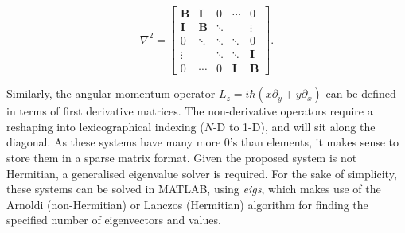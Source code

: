 \begin{equation}
    \nabla^2=
    \begin{bmatrix}
        \mathbf{B}    & \mathbf{I} &      0      &  \cdots      &      0       \\
        \mathbf{I}    & \mathbf{B} &  \ddots     &              &  \vdots      \\
        0             & \ddots     &  \ddots     &  \ddots      &      0       \\
        \vdots        &            &  \ddots     &  \ddots      &  \mathbf{I}  \\
        0             & \cdots     &      0      &  \mathbf{I}  &  \mathbf{B}
    \end{bmatrix}.
\end{equation}

Similarly, the angular momentum operator $L_z = i\hbar(x\partial_y + y\partial_x)$ can be defined in terms of first derivative matrices. The non-derivative operators require a reshaping into lexicographical indexing ($N$-D to 1-D), and will sit along the diagonal. As these systems have many more 0's than elements, it makes sense to store them in a sparse matrix format. Given the proposed system is not Hermitian, a generalised eigenvalue solver is required. For the sake of simplicity, these systems can be solved in MATLAB, using \textit{eigs}, which makes use of the Arnoldi (non-Hermitian) or Lanczos (Hermitian) algorithm for finding the specified number of eigenvectors and values.
